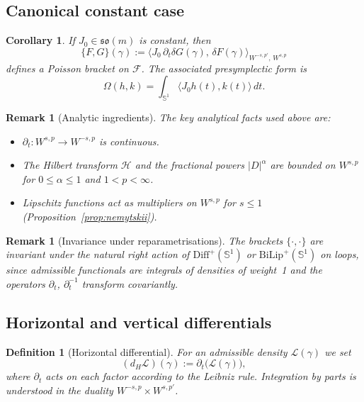 \documentclass{amsart}
\newcounter{thm}
\newcounter{re}
\newtheorem{corollary}[thm]{Corollary}
\newtheorem{remark}[thm]{Remark}
\newtheorem{definition}[thm]{Definition}
\begin{document}
\subsection{Canonical constant case}
\begin{corollary}
If \(J_{0}\in\mathfrak{so}(m)\) is constant, then
\[
\{F,G\}(\gamma)
   :=\big\langle J_{0}\,\partial_{t}\delta G(\gamma),\,
              \delta F(\gamma)\big\rangle_{W^{-s,p'},\,W^{s,p}}
\]
defines a Poisson bracket on \(\mathcal F\).  The associated presymplectic form is
\[
\Omega(h,k)=\int_{\mathbb S^{1}}\langle J_{0}h(t),k(t)\rangle\,dt .
\]
\end{corollary}

\begin{remark}[Analytic ingredients]\label{rem:analytic}
The key analytical facts used above are:
\begin{itemize}
  \item \(\partial_{t}:W^{s,p}\to W^{-s,p}\) is continuous.
  \item The Hilbert transform \(\mathcal H\) and the fractional powers \(|D|^{\alpha}\) are bounded on \(W^{s,p}\) for \(0\le\alpha\le1\) and \(1<p<\infty\).
  \item Lipschitz functions act as multipliers on \(W^{s,p}\) for \(s\le1\) (Proposition~\ref{prop:nemytskii}).
\end{itemize}
\end{remark}

\begin{remark}[Invariance under reparametrisations]\label{rem:invariance}
The brackets \(\{\cdot,\cdot\}\) are invariant under the natural right action of
\(\mathrm{Diff}^{+}(\mathbb S^{1})\) or \(\mathrm{BiLip}^{+}(\mathbb S^{1})\) on loops,
since admissible functionals are integrals of densities of weight~1 and the
operators \(\partial_{t}\), \(\partial_{t}^{-1}\) transform covariantly.
\end{remark}


\subsection{Horizontal and vertical differentials}
\begin{definition}[Horizontal differential]\label{def:dH}
For an admissible density \(\mathcal L(\gamma)\) we set
\[
(d_{H}\mathcal L)(\gamma)
   :=\partial_{t}\bigl(\mathcal L(\gamma)\bigr),
\]
where \(\partial_{t}\) acts on each factor according to the Leibniz rule.
Integration by parts is understood in the duality
\(W^{-s,p}\times W^{s,p'}\).
\end{definition}
\end{document}
